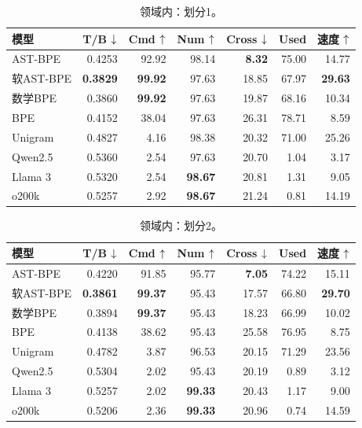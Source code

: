 \begin{table}[H]
\centering\small\renewcommand{\arraystretch}{1.05}
\caption{领域内：划分1。}\label{tab:detail1}
\begin{tabular}{lrrrrrr}\toprule
模型&T/B $\downarrow$&Cmd $\uparrow$&Num $\uparrow$&Cross $\downarrow$&Used&速度 $\uparrow$\\\midrule
AST-BPE & 0.4253 & 92.92 & 98.14 & \textbf{8.32} & 75.00 & 14.77 \\
软AST-BPE & \textbf{0.3829} & \textbf{99.92} & 97.63 & 18.85 & 67.97 & \textbf{29.63} \\
数学BPE & 0.3860 & \textbf{99.92} & 97.63 & 19.87 & 68.16 & 10.34 \\
BPE & 0.4152 & 38.04 & 97.63 & 26.31 & 78.71 & 8.59 \\
Unigram & 0.4827 & 4.16 & 98.38 & 20.32 & 71.00 & 25.26 \\
\midrule
Qwen2.5 & 0.5360 & 2.54 & 97.63 & 20.70 & 1.04 & 3.17 \\
Llama 3 & 0.5320 & 2.54 & \textbf{98.67} & 20.81 & 1.31 & 9.05 \\
o200k & 0.5257 & 2.92 & \textbf{98.67} & 21.24 & 0.81 & 14.19 \\
\bottomrule\end{tabular}
\end{table}

\begin{table}[H]
\centering\small\renewcommand{\arraystretch}{1.05}
\caption{领域内：划分2。}\label{tab:detail2}
\begin{tabular}{lrrrrrr}\toprule
模型&T/B $\downarrow$&Cmd $\uparrow$&Num $\uparrow$&Cross $\downarrow$&Used&速度 $\uparrow$\\\midrule
AST-BPE & 0.4220 & 91.85 & 95.77 & \textbf{7.05} & 74.22 & 15.11 \\
软AST-BPE & \textbf{0.3861} & \textbf{99.37} & 95.43 & 17.57 & 66.80 & \textbf{29.70} \\
数学BPE & 0.3894 & \textbf{99.37} & 95.43 & 18.23 & 66.99 & 10.02 \\
BPE & 0.4138 & 38.62 & 95.43 & 25.58 & 76.95 & 8.75 \\
Unigram & 0.4782 & 3.87 & 96.53 & 20.15 & 71.29 & 23.56 \\
\midrule
Qwen2.5 & 0.5304 & 2.02 & 95.43 & 20.19 & 0.89 & 3.12 \\
Llama 3 & 0.5257 & 2.02 & \textbf{99.33} & 20.43 & 1.17 & 9.00 \\
o200k & 0.5206 & 2.36 & \textbf{99.33} & 20.96 & 0.74 & 14.59 \\
\bottomrule\end{tabular}
\end{table}

